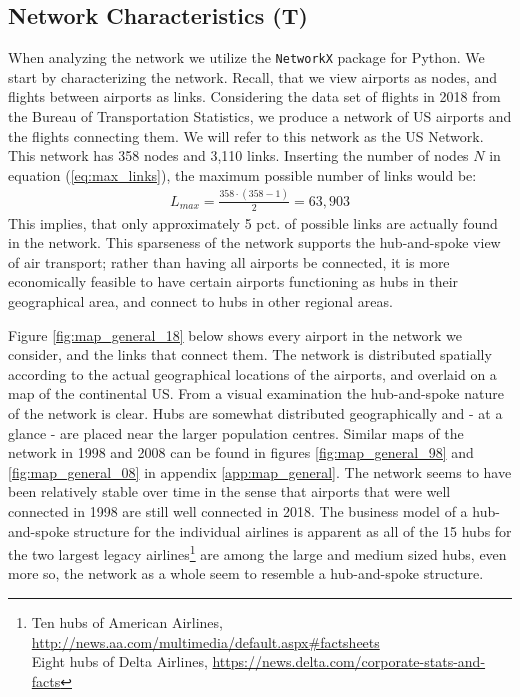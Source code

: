\label{sec:empirical}
\subsection{Network Characteristics (T)}
\label{subsec:empirical_network_characteristics}
When analyzing the network we utilize the \texttt{NetworkX} package for Python. We start by characterizing the network. Recall, that we view airports as nodes, and flights between airports as links. Considering the data set of flights in 2018 from the Bureau of Transportation Statistics, we produce a network of US airports and the flights connecting them. We will refer to this network as the US Network. This network has 358 nodes and 3,110 links. Inserting the number of nodes $N$ in equation (\ref{eq:max_links}), the maximum possible number of links would be: 
\begin{align}
    L_{max}  = \frac{358\cdot(358-1)}{2} = 63,903
\end{align}
This implies, that only approximately 5 pct. of possible links are actually found in the network. This sparseness of the network supports the hub-and-spoke view of air transport; rather than having all airports be connected, it is more economically feasible to have certain airports functioning as hubs in their geographical area, and connect to hubs in other regional areas.
\par
Figure \ref{fig:map_general_18} below shows every airport in the network we consider, and the links that connect them. The network is distributed spatially according to the actual geographical locations of the airports, and overlaid on a map of the continental US. From a visual examination the hub-and-spoke nature of the network is clear. Hubs are somewhat distributed geographically and - at a glance - are placed near the larger population centres. Similar maps of the network in 1998 and 2008 can be found in figures \ref{fig:map_general_98} and \ref{fig:map_general_08} in appendix \ref{app:map_general}. The network seems to have been relatively stable over time in the sense that airports that were well connected in 1998 are still well connected in 2018. The business model of a hub-and-spoke structure for the individual airlines is apparent as all of the 15 hubs for the two largest legacy airlines\footnote{Ten hubs of American Airlines, \url{http://news.aa.com/multimedia/default.aspx#factsheets}\\
Eight hubs of Delta Airlines, \url{https://news.delta.com/corporate-stats-and-facts}} are among the large and medium sized hubs, even more so, the network as a whole seem to resemble a hub-and-spoke structure.
